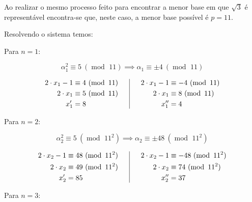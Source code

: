\documentclass{report}
\DeclareMathOperator{\modulo}{mod \ }
\theoremstyle{definition}
\begin{document}
Ao realizar o mesmo processo feito para encontrar a menor base em que $\sqrt3$ é representável encontra-se que, neste caso, a menor base possível é $p=11$.

Resolvendo o sistema temos:

\bigskip

Para $n = 1$:

\begin{equation*}
    \alpha_1^2 \equiv 5 \ (\modulo 11) \implies \alpha_1 \equiv \pm 4 \ (\modulo 11)
\end{equation*}

\begin{equation*}
    \begin{aligned}[c]
        2 \cdot x_1 - 1 &\equiv 4 \ (\modulo 11)\\
        2 \cdot x_1 &\equiv 5 \ (\modulo 11)\\
        x'_1 &= 8
    \end{aligned}
    \hphantom{OO}\vline\hphantom{OO}
    \begin{aligned}[c]
        2 \cdot x_1 - 1 &\equiv -4 \ (\modulo 11)\\
        2 \cdot x_1 &\equiv 8 \ (\modulo 11)\\
        x''_1 &= 4
    \end{aligned}
\end{equation*}

Para $n = 2$:

\begin{equation*}
    \alpha_2^2 \equiv 5 \ (\modulo 11^2) \implies \alpha_2 \equiv \pm 48 \ (\modulo 11^2)
\end{equation*}

\begin{equation*}
    \begin{aligned}[c]
        2 \cdot x_2 - 1 &\equiv 48 \ (\modulo 11^2)\\
        2 \cdot x_2 &\equiv 49 \ (\modulo 11^2)\\
        x'_2 &= 85
    \end{aligned}
    \hphantom{OO}\vline\hphantom{OO}
    \begin{aligned}[c]
        2 \cdot x_2 - 1 &\equiv -48 \ (\modulo 11^2)\\
        2 \cdot x_2 &\equiv 74 \ (\modulo 11^2)\\
        x''_2 &= 37
    \end{aligned}
\end{equation*}

Para $n = 3$:
\end{document}
